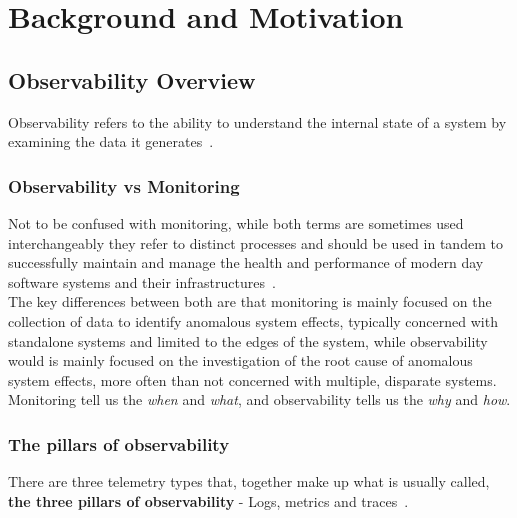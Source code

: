 %
%
\chapter{Background and Motivation} \label{ch:background}


\section{Observability Overview}\label{sec:observability-overview}
Observability refers to the ability to understand the internal state of a system by examining the data it generates~\cite{ibm_observability}.\\

\subsection{Observability vs Monitoring}\label{subsec:observability-vs-monitoring}
Not to be confused with monitoring, while both terms are sometimes used interchangeably they refer to distinct
processes and should be used in tandem to successfully maintain and manage the health and performance of modern day
software systems and their infrastructures~\cite{aws_observability_vs_monitoring}.\\

The key differences between both are that monitoring is mainly focused on the collection of data to identify
anomalous system effects, typically concerned with standalone systems and limited to the edges of the system, while
observability would is mainly focused on the investigation of the root cause of anomalous system effects, more often
than not concerned with multiple, disparate systems.
Monitoring tell us the \textit{when} and \textit{what}, and observability tells us the \textit{why} and \textit{how}.\\

\subsection{The pillars of observability}\label{subsec:the-pillars-of-observability}
There are three telemetry types that, together make up what is usually called,
\textbf{the three pillars of observability} - Logs, metrics and traces~\cite{ibm_observability}.\\

